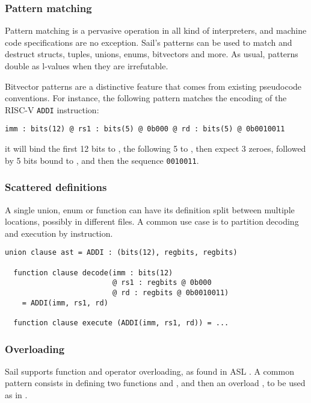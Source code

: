 
\subsubsection{Pattern matching}

Pattern matching is a pervasive operation in all kind of interpreters, and machine code specifications are no exception. Sail's patterns can be used to match and destruct structs, tuples, unions, enums, bitvectors and more. As usual, patterns double as l-values when they are irrefutable.

Bitvector patterns are a distinctive feature that comes from existing pseudocode conventions. For instance, the following pattern matches the encoding of the RISC-V \texttt{ADDI} instruction:
\begin{lstlisting}[language=sail]
  imm : bits(12) @ rs1 : bits(5) @ 0b000 @ rd : bits(5) @ 0b0010011
\end{lstlisting}
it will bind the first 12 bits to , the following 5 to , then expect 3 zeroes, followed by 5 bits bound to , and then the sequence \texttt{0010011}.

\subsubsection{Scattered definitions}

A single union, enum or function can have its definition split between multiple locations, possibly in different files. A common use case is to partition decoding and execution by instruction.

\begin{lstlisting}[language=sail]
  union clause ast = ADDI : (bits(12), regbits, regbits)

  function clause decode(imm : bits(12)
                         @ rs1 : regbits @ 0b000
                         @ rd : regbits @ 0b0010011)
    = ADDI(imm, rs1, rd)

  function clause execute (ADDI(imm, rs1, rd)) = ...
\end{lstlisting}

\subsubsection{Overloading}

Sail supports function and operator overloading, as found \eg in ASL \cite{Reid2016}. A common pattern consists in defining two functions  and , and then an overload , to be used as in .

